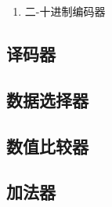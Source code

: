 \documentclass[UTF8]{article}
\begin{document}
\begin{enumerate}
                从逻辑图可以得到$F_{S}$和$\overline{F_{EX}}$的表达式：
                \begin{equation}
                    \begin{aligned}
                        F_{S}&=I_{0}+I_{1}+I_{2}+...+I_{7}+\overline{S}\\
                        &=\overline{\overline{I_{0}}\cdot \overline{I_{1}}\cdot \overline{I_{2}}\cdot ...\cdot\overline{I_{7}}\cdot S}\\
                        &=\overline{\overline{I_{0}+I_{1}+I_{2}+...+I_{7}}\cdot S}
                    \end{aligned}
                \end{equation}

                \begin{equation}
                    \begin{aligned}
                        \overline{F_{EX}}&=\overline{F_{S}\cdot S}\\
                        &=\overline{S}+S\cdot \overline{I_{0}+I_{1}+I_{2}+...+I_{7}}\\
                        &=\overline{S}+\overline{I_{0}+I_{1}+I_{2}+...+I_{7}}\\
                        &=\overline{S\cdot (I_{0}+I_{1}+I_{2}+...+I_{7})}
                    \end{aligned}
                \end{equation}

                从(5)的表达式中，我们可以得知
                只有当$\overline{S}=0$，也即其他输入正常工作，
                且不存在有效信号时，$F_{S}$才输出为低电平。
                因此，{\heiti $F_{S}$输出低电平表示该电路正常工作，且无有效信号输入。}
                我们称$F_{S}$为{\heiti 使能输出端}。

                从(6)的表达式中，我们可以得知
                只有当$\overline{S}=0$，也即其他输入正常工作，
                且存在有效信号时，$F_{EX}$才输出为低电平。
                因此，{\heiti $F_{EX}$输出低电平表示该电路正常工作，且存在有效信号输入。}
                我们称$F_{EX}$为{\heiti 扩展输出端}。


        \item 二-十进制编码器
        
    \end{enumerate}

\subsection{译码器}

\subsection{数据选择器}

\subsection{数值比较器}

\subsection{加法器}
\end{document}
